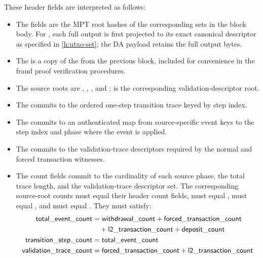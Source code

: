\documentclass[../midgard.tex]{subfiles}
\begin{document}
These header fields are interpreted as follows:
\begin{itemize}
    \item The  fields are the MPT root hashes of the corresponding sets in the block body. For , each full output is first projected to its exact canonical  descriptor as specified in \cref{h:utxo-set}; the DA payload retains the full output bytes.
    \item The  is a copy of the  from the previous block, included for convenience in the fraud proof verification procedures.
    \item The source roots are , , , and ;  is the corresponding validation-descriptor root.
    \item The  commits to the ordered one-step transition trace keyed by step index.
    \item The  commits to an authenticated map from source-specific event keys to the step index and phase where the event is applied.
    \item The  commits to the validation-trace descriptors required by the normal and forced transaction witnesses.
    \item The count fields commit to the cardinality of each source phase, the total trace length, and the validation-trace descriptor set. The corresponding source-root counts must equal their header count fields,  must equal ,  must equal , and  must equal . They must satisfy:
    \begin{align*}
        \mathsf{total\_event\_count} &=
            \mathsf{withdrawal\_count}
            + \mathsf{forced\_transaction\_count} \\
        &\quad
            + \mathsf{l2\_transaction\_count}
            + \mathsf{deposit\_count} \\
        \mathsf{transition\_step\_count} &= \mathsf{total\_event\_count}
        \\
        \mathsf{validation\_trace\_count} &=
            \mathsf{forced\_transaction\_count}
            + \mathsf{l2\_transaction\_count}
    \end{align*}

\end{itemize}
\end{document}
